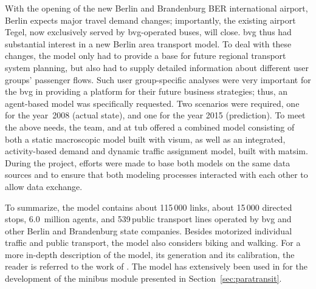 With the opening of the new Berlin and Brandenburg BER international airport,
Berlin expects major travel demand changes; importantly, the
existing airport Tegel, now exclusively served by \gls{bvg}-operated buses, 
will close. \gls{bvg} thus had substantial interest in a new Berlin area transport model. 
To deal with these changes, the model only had to provide
a base for future regional transport system planning, but also had to supply
detailed information about different user groups' passenger flows. 
Such user group-specific analyses were very important for
the \gls{bvg} in providing a platform for their future business strategies; thus,
an agent-based model was specifically requested. Two scenarios were
required, one for the year~2008 (actual state), and one for the year
2015 (prediction). To meet the above needs, the
\citet{PTV2013} team, \citet{Senozon2013} and \citet{VSP2013} at \gls{tub}
offered a combined model consisting of both a static macroscopic model built with
\gls{visum}, as well as an integrated, activity-based demand and
dynamic traffic assignment model, built with \gls{matsim}. During
the project, efforts were made to base both models on the same data
sources and to ensure that both modeling processes interacted with each other to allow data
exchange.

To summarize, the model contains about 115\,000 links, %
about 15\,000 directed stops, %
6.0~million agents, %
and 539\,public transport lines operated by \gls{bvg} and other Berlin and Brandenburg state companies. 
Besides motorized individual traffic and public transport, the model also considers biking and walking. 
For a more in-depth description of the model, its generation and its calibration, the reader is referred to the work of
\cite{NeumannEtAl2014IatbrPtBerlinBook}. The model has extensively been used in \citet[][Ch.~7/8]{Neumann2014PhD} for the development of the minibus module presented in Section~\ref{sec:paratransit}.

